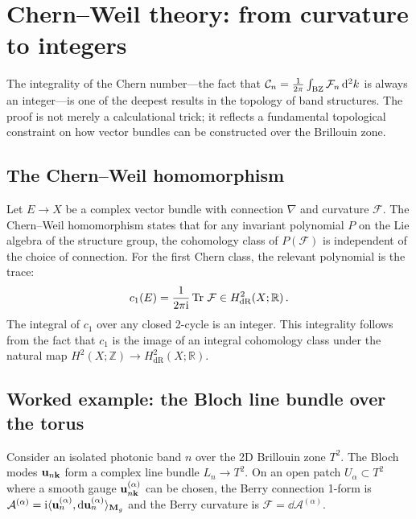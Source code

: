 \section{Chern--Weil theory: from curvature to integers}
\label{sec:appB-chern-weil}

The integrality of the Chern number---the fact that
$\mathcal{C}_n=\frac{1}{2\pi}\int_{\mathrm{BZ}}\mathcal{F}_n\,\mathrm{d}^2 k$
is always an integer---is one of the deepest results in the topology
of band structures.  The proof is not merely a calculational trick;
it reflects a fundamental topological constraint on how vector bundles
can be constructed over the Brillouin zone.

\subsection{The Chern--Weil homomorphism}
\label{sec:appB-chern-weil-hom}

Let $E\to X$ be a complex vector bundle with connection $\nabla$ and
curvature $\mathcal{F}$.  The Chern--Weil homomorphism states that for
any invariant polynomial $P$ on the Lie algebra of the structure group,
the cohomology class of $P(\mathcal{F})$ is independent of the choice
of connection.  For the first Chern class, the relevant polynomial is
the trace:
\begin{equation}\label{eq:appB-cw-first}
  c_1(E) = \frac{1}{2\pi\mathrm{i}}\operatorname{Tr}\,\mathcal{F}
  \in H^2_{\mathrm{dR}}(X;\mathbb{R})\,.
\end{equation}
The integral of $c_1$ over any closed 2-cycle is an integer.  This
integrality follows from the fact that $c_1$ is the image of an
integral cohomology class under the natural map
$H^2(X;\mathbb{Z})\to H^2_{\mathrm{dR}}(X;\mathbb{R})$.

\subsection{Worked example: the Bloch line bundle over the torus}
\label{sec:appB-cw-example}

Consider an isolated photonic band $n$ over the 2D Brillouin zone
$T^2$.  The Bloch modes $\mathbf{u}_{n\mathbf{k}}$ form a complex line
bundle $L_n\to T^2$.  On an open patch $U_\alpha\subset T^2$ where a
smooth gauge $\mathbf{u}_{n\mathbf{k}}^{(\alpha)}$ can be chosen, the
Berry connection 1-form is
$\mathcal{A}^{(\alpha)}
=\mathrm{i}\langle \mathbf{u}_n^{(\alpha)} , \mathrm{d}\mathbf{u}_n^{(\alpha)} \rangle_{\mathbf{M}_g}$
and the Berry curvature is
$\mathcal{F}=\dd\mathcal{A}^{(\alpha)}$.

